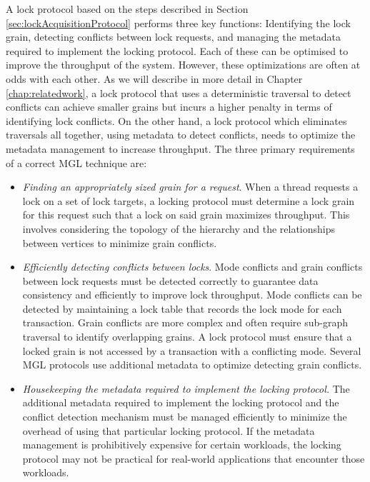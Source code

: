 A lock protocol based on the steps described in Section \ref{sec:lockAcquisitionProtocol} performs three key functions: Identifying the lock grain, detecting conflicts between lock requests, and managing the metadata required to implement the locking protocol. Each of these can be optimised to improve the throughput of the system. However, these optimizations are often at odds with each other. As we will describe in more detail in Chapter \ref{chap:relatedwork}, a lock protocol that uses a deterministic traversal to detect conflicts can achieve smaller grains but incurs a higher penalty in terms of identifying lock conflicts. On the other hand, a lock protocol which eliminates traversals all together, using metadata to detect conflicts, needs to optimize the metadata management to increase throughput. The three primary requirements of a correct MGL technique are:

\begin{itemize}

    \item[\Rb] \emph{Finding an appropriately sized grain for a request}. When a thread requests a lock on a set of lock targets, a locking protocol must determine a lock grain for this request such that a lock on said grain maximizes throughput. This involves considering the topology of the hierarchy and the relationships between vertices to minimize grain conflicts.
    
    \item[\Rc] \emph{Efficiently detecting conflicts between locks}. Mode conflicts and grain conflicts between lock requests must be detected correctly to guarantee data consistency and efficiently to improve lock throughput. Mode conflicts can be detected by maintaining a lock table that records the lock mode for each transaction. Grain conflicts are more complex and often require sub-graph traversal to identify overlapping grains. A lock protocol must ensure that a locked grain is not accessed by a transaction with a conflicting mode. Several MGL protocols use additional metadata to optimize detecting grain conflicts.
    
    
    \item[\Rd] \emph{Housekeeping the metadata required to implement the locking protocol.} The additional metadata required to implement the locking protocol and the conflict detection mechanism must be managed efficiently to minimize the overhead of using that particular locking protocol. If the metadata management is prohibitively expensive for certain workloads, the locking protocol may not be practical for real-world applications that encounter those workloads. 

\end{itemize}


